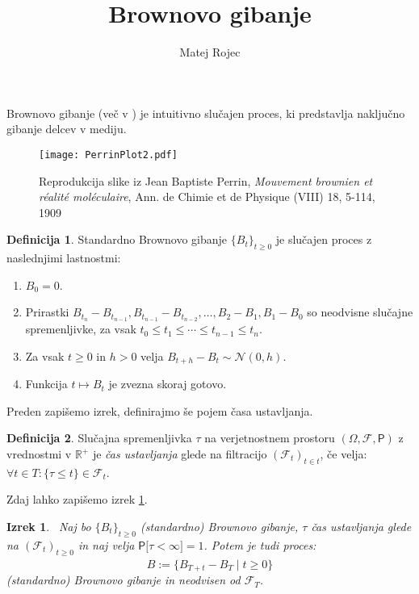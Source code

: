 \documentclass[11pt]{article}
\title{Brownovo gibanje}
\author{Matej Rojec}
\date{}
\theoremstyle{definition}
\newtheorem{definicija}{Definicija}
\theoremstyle{plain}
\newtheorem{izrek}{Izrek}
\newcommand{\f}{\mathcal{F}}
\begin{document}
\maketitle

Brownovo gibanje (več v \cite{karatzas1991brownian}) je intuitivno slučajen proces, %
ki predstavlja naključno gibanje delcev v mediju.

\begin{figure}[!ht]
    \centering
    \texttt{[image: PerrinPlot2.pdf]}
    \caption{Reprodukcija slike iz Jean Baptiste Perrin, \emph{Mouvement brownien et réalité moléculaire}, Ann. de Chimie et de Physique (VIII) 18, 5-114, 1909}
\end{figure}

\begin{definicija}
    Standardno Brownovo gibanje $\{B_t\}_{t \geq 0}$ je slučajen proces z naslednjimi lastnostmi: 
    
    \begin{enumerate}
        \item $B_0 = 0$.
        \item Prirastki $B_{t_n} - B_{t_{n-1}}, B_{t_{n-1}} - B_{t_{n-2}}, \ldots, B_2 - B_1, B_1 - B_0$ so neodvisne slučajne spremenljivke, za vsak $t_0 \leq t_1 \leq \cdots \leq t_{n-1} \leq t_n$.
        \item Za vsak $t \geq 0$ in $h > 0$ velja $B_{t+h} - B_t \sim \mathcal{N}(0, h)$.
        \item Funkcija $t \mapsto B_t$ je zvezna skoraj gotovo.
    \end{enumerate}

\end{definicija}
 
    
Preden zapišemo izrek, definirajmo še pojem časa ustavljanja.
    
 
\begin{definicija}
    Slučajna spremenljivka $\tau$ na verjetnostnem prostoru $(\Omega, \f, \mathsf{P} )$ z vrednostmi v $\mathbb{R}^+$
    je \emph{čas ustavljanja} glede na filtracijo $(\f_t)_{t \in t}$, če velja: $\forall t \in T : \{\tau\leq t\} \in \f_t$.
\end{definicija}
    
    Zdaj lahko zapišemo izrek \ref{thm:stopped_brownian}. 
    

\begin{izrek}
    \
    Naj bo $\{B_t\}_{t \geq 0}$ (standardno) Brownovo gibanje, $\tau$ čas ustavljanja glede na 
    $(\f_t)_{t \geq 0}$ in naj velja $\mathsf{P}  \lbrack \tau < \infty \rbrack = 1$.
    Potem je tudi proces:
    \[
    \hat{B} := \{B_{T+t} - B_T \mid t \geq 0\}
    \]
    (standardno) Brownovo gibanje in neodvisen od $\f_T$.
    \label{thm:stopped_brownian}
\end{izrek}

    


\end{document}
